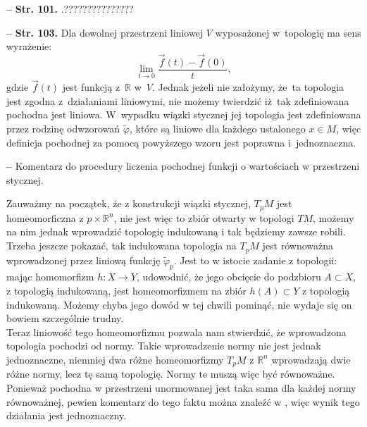 \documentclass[a4paper,11pt]{article}
\newcommand{\fr}{\frac}
\newcommand{\mb}{\mathbb}
\newcommand{\Lim}{\lim\limits}
\newcommand{\ra}{\rightarrow}
\newcommand{\tb}{\textbf}
\newcommand{\noi}{\noindent}
\newcommand{\start}{\noi \tb{--} {}}
\newcommand{\Str}[1]{\tb{Str. #1.}}
\begin{document}
\start \Str{101} .???????????????

\start \Str{103} Dla dowolnej przestrzeni liniowej $V$ wyposażonej
w~topologię ma sens wyrażenie:
\begin{equation*}
  \Lim_{ t \ra 0 } \fr{ \vec{ f }( t ) - \vec{ f }( 0 )}{ t },
\end{equation*}
gdzie $\vec{ f }( t )$ jest funkcją z~$\mb{R}$ w~$V$. Jednak jeżeli
nie założymy, że~ta topologia jest zgodna z~działaniami liniowymi, nie
możemy twierdzić iż~tak zdefiniowana pochodna jest liniowa. W~wypadku
wiązki stycznej jej topologia jest zdefiniowana przez rodzinę
odwzorowań $\widetilde{\varphi}$, które są liniowe dla każdego
ustalonego $x \in M$, więc definicja pochodnej za pomocą powyższego
wzoru jest poprawna i~jednoznaczna.

\start Komentarz do procedury liczenia pochodnej funkcji o wartościach
w przestrzeni stycznej.

Zauważmy na początek, że z konstrukcji wiązki stycznej, $T_{ p }M$
jest homeomorficzna z $p \times \mathbb{R}^{ n }$, nie jest więc to
zbiór otwarty w topologi $TM$, możemy na nim jednak wprowadzić
topologię indukowaną i tak będziemy zawsze robili. Trzeba jeszcze
pokazać, tak indukowana topologia na $T_{ p }M$ jest równoważna
wprowadzonej przez liniową funkcję $\widetilde{\varphi}_{ p }$. Jest
to w istocie zadanie z topologii: mając homomorfizm
$h : X \rightarrow Y$, udowodnić,
że jego obcięcie do podzbioru $A \subset X$, z topologią indukowaną, jest homeomorfizmem na zbiór $h( A ) \subset Y$ z topologią indukowaną. Możemy chyba jego dowód w tej chwili pominąć, nie wydaje się on bowiem szczególnie trudny. \\
Teraz liniowość tego homeomorfizmu pozwala nam stwierdzić, że
wprowadzona topologia pochodzi od normy. Takie wprowadzenie normy nie
jest jednak jednoznaczne, niemniej dwa różne homeomorfizmy $T_{ p }M$
z $\mathbb{R}^{ n }$ wprowadzają dwie różne normy, lecz tę samą
topologię. Normy te muszą więc być równoważne. Ponieważ pochodna w
przestrzeni unormowanej jest taka sama dla każdej normy równoważnej,
pewien komentarz do tego faktu można znaleźć w \cite{Sch79}, więc
wynik tego działania jest jednoznaczny.
\end{document}
